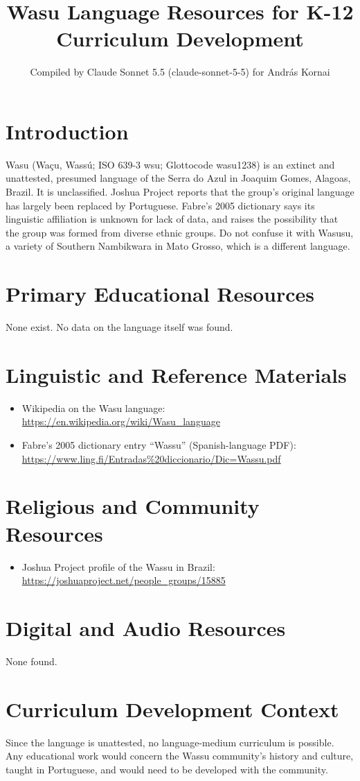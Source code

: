\documentclass[12pt]{article}
\title{Wasu Language Resources for K-12 Curriculum Development}
\author{Compiled by Claude Sonnet 5.5 (claude-sonnet-5-5) for Andr\'as Kornai}
\date{}
\begin{document}
\maketitle

\section{Introduction}
Wasu (Wa\c{c}u, Wass\'u; ISO 639-3 wsu; Glottocode wasu1238) is an extinct and unattested, presumed language of the Serra do Azul in Joaquim Gomes, Alagoas, Brazil. It is unclassified. Joshua Project reports that the group's original language has largely been replaced by Portuguese. Fabre's 2005 dictionary says its linguistic affiliation is unknown for lack of data, and raises the possibility that the group was formed from diverse ethnic groups. Do not confuse it with Wasusu, a variety of Southern Nambikwara in Mato Grosso, which is a different language.

\section{Primary Educational Resources}
None exist. No data on the language itself was found.

\section{Linguistic and Reference Materials}
\begin{itemize}
\item Wikipedia on the Wasu language: \url{https://en.wikipedia.org/wiki/Wasu_language}
\item Fabre's 2005 dictionary entry ``Wassu'' (Spanish-language PDF): \url{https://www.ling.fi/Entradas%20diccionario/Dic=Wassu.pdf}
\end{itemize}

\section{Religious and Community Resources}
\begin{itemize}
\item Joshua Project profile of the Wassu in Brazil: \url{https://joshuaproject.net/people_groups/15885}
\end{itemize}

\section{Digital and Audio Resources}
None found.

\section{Curriculum Development Context}
Since the language is unattested, no language-medium curriculum is possible. Any educational work would concern the Wassu community's history and culture, taught in Portuguese, and would need to be developed with the community.
\end{document}
